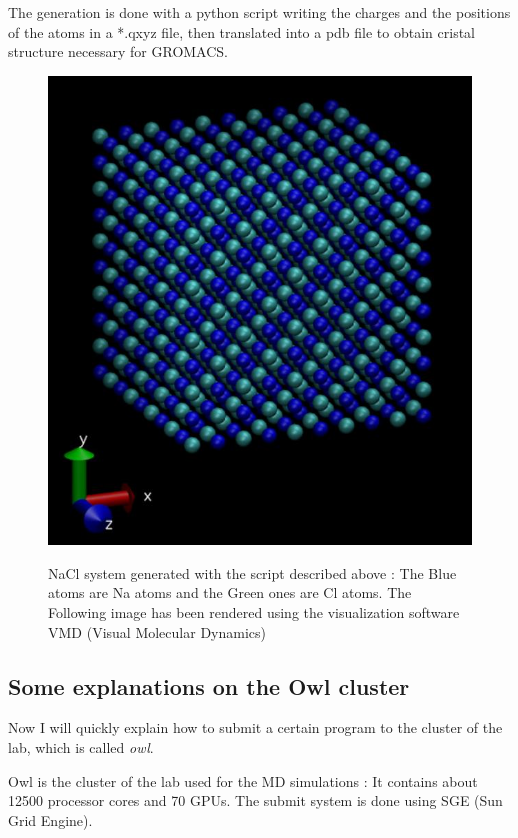 \documentclass[10pt,twoside,a4paper]{report}
\begin{document}
The generation is done with a python script writing the charges and the positions of the atoms in a *.qxyz file, then translated into a pdb file to obtain cristal structure necessary for GROMACS.

\begin{figure}[H]
	   \includegraphics[scale=0.4]{nacl}
	   \label{fig:nacl_system}
    \centering 
    \caption{NaCl system generated with the script described above : The Blue atoms are Na atoms and the Green ones are Cl atoms. The Following image has been rendered using the visualization software VMD (Visual Molecular Dynamics)}    
   \end{figure}  


\subsection{Some explanations on the Owl cluster}

Now I will quickly explain how to submit a certain program to the cluster of the lab, which is called \textit{owl}.

Owl is the cluster of the lab used for the MD simulations : It contains about 12500 processor cores and 70 GPUs. The submit system is done using SGE (Sun Grid Engine).  
\end{document}
